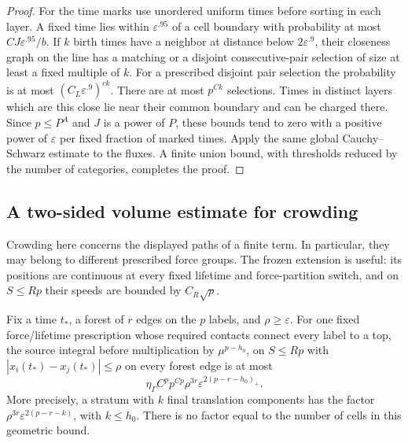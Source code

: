 \begin{proof}
For the time marks use unordered uniform times before sorting in
each layer.  A fixed time lies within $\varepsilon^{.95}$ of a cell
boundary with probability at most
$CJ\varepsilon^{.95}/b$.  If $k$ birth times have a neighbor at
distance below $2\varepsilon^{.9}$, their closeness graph on the
line has a matching or a disjoint consecutive-pair selection of
size at least a fixed multiple of $k$.  For a prescribed disjoint
pair selection the probability is at most
$(C_L\varepsilon^{.9})^{ck}$.  There are at most $p^{Ck}$ selections.
Times in distinct layers which are this close lie near their common
boundary and can be charged there.  Since $p\leq P^A$ and $J$ is
a power of $P$, these bounds tend to zero with a positive power of
$\varepsilon$ per fixed fraction of marked times.  Apply the same
global Cauchy--Schwarz estimate to the fluxes.  A finite union bound,
with thresholds reduced by the number of categories, completes the
proof.
\end{proof}

\subsection{A two-sided volume estimate for crowding}

Crowding here concerns the displayed paths of a finite term.  In
particular, they may belong to different prescribed force groups.
The frozen extension is useful: its positions are continuous at every
fixed lifetime and force-partition switch, and on $S\leq Rp$ their
speeds are bounded by $C_R\sqrt p$.

\begin{lemma}
\label{hist:pivot}
Fix a time $t_*$, a forest of $r$ edges on the $p$ labels, and
$\rho\geq\varepsilon$.  For one fixed force/lifetime prescription
whose required contacts connect every label to a top, the source integral
before multiplication by $\mu^{p-h_0}$, on $S\leq Rp$ with
$|x_i(t_*)-x_j(t_*)|\leq\rho$ on every forest edge is at most
\begin{equation}
 \eta_\Gamma C^p p^{Cp}\rho^{3r}
       \varepsilon^{2(p-r-h_0)_+}.
 \label{eq:hist-pivot-bound}
\end{equation}
More precisely, a stratum with $k$ final translation components has
the factor $\rho^{3r}\varepsilon^{2(p-r-k)}$, with $k\leq h_0$.
There is no factor equal to the number of cells in this geometric
bound.
\end{lemma}

